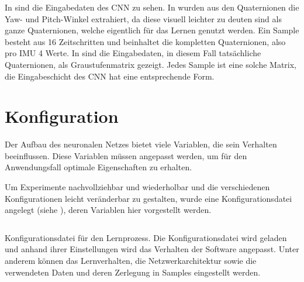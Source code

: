 In  sind die Eingabedaten des CNN zu sehen. In  wurden aus den Quaternionen die Yaw- und Pitch-Winkel extrahiert, da diese visuell leichter zu deuten sind als ganze Quaternionen, welche eigentlich für das Lernen genutzt werden. Ein Sample besteht aus 16 Zeitschritten und beinhaltet die kompletten Quaternionen, also pro IMU 4 Werte.
In  sind die Eingabedaten, in diesem Fall tatsächliche Quaternionen, als Graustufenmatrix gezeigt. Jedes Sample ist eine solche Matrix, die Eingabeschicht des CNN hat eine entsprechende Form.



\section{Konfiguration}

Der Aufbau des neuronalen Netzes bietet viele Variablen, die sein Verhalten beeinflussen. Diese Variablen müssen angepasst werden, um für den Anwendungsfall optimale Eigenschaften zu erhalten.

Um Experimente nachvollziehbar und wiederholbar und die verschiedenen Konfigurationen leicht veränderbar zu gestalten, wurde eine Konfigurationsdatei angelegt (siehe ), deren Variablen hier vorgestellt werden.

\begin{listing}[h]
    \inputminted{yaml}{../common/code/config.yaml}
    \caption[Konfigurationsdatei]{Konfigurationsdatei für den Lernprozess. Die Konfigurationsdatei wird geladen und anhand ihrer Einstellungen wird das Verhalten der Software angepasst. Unter anderem können das Lernverhalten, die Netzwerkarchitektur sowie die verwendeten Daten und deren Zerlegung in Samples eingestellt werden.}
\end{listing}

